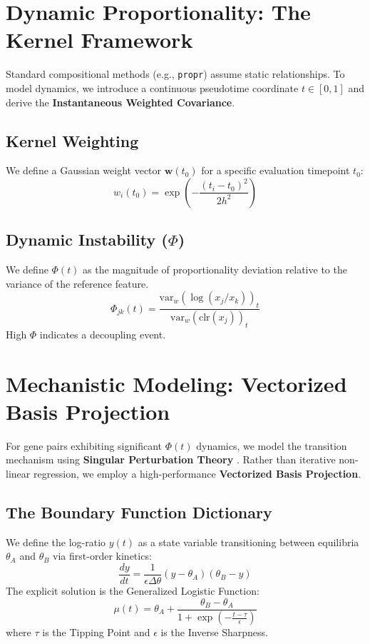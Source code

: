 \documentclass[11pt, a4paper]{article}
\begin{document}
\section{Dynamic Proportionality: The Kernel Framework}

Standard compositional methods (e.g., \texttt{propr}) assume static relationships. To model dynamics, we introduce a continuous pseudotime coordinate $t \in [0,1]$ and derive the \textbf{Instantaneous Weighted Covariance}.

\subsection{Kernel Weighting}
We define a Gaussian weight vector $\mathbf{w}(t_0)$ for a specific evaluation timepoint $t_0$:
\begin{equation}
w_i(t_0) = \exp\left( -\frac{(t_i - t_0)^2}{2h^2} \right)
\end{equation}

\subsection{Dynamic Instability ($\Phi$)}
We define $\Phi(t)$ as the magnitude of proportionality deviation relative to the variance of the reference feature.
\begin{equation}
\Phi_{jk}(t) = \frac{\text{var}_w(\log(x_j/x_k))_t}{\text{var}_w(\text{clr}(x_j))_t}
\end{equation}
High $\Phi$ indicates a decoupling event.

\section{Mechanistic Modeling: Vectorized Basis Projection}

For gene pairs exhibiting significant $\Phi(t)$ dynamics, we model the transition mechanism using \textbf{Singular Perturbation Theory} \citep{verhulst1838}. Rather than iterative non-linear regression, we employ a high-performance \textbf{Vectorized Basis Projection}.

\subsection{The Boundary Function Dictionary}
We define the log-ratio $y(t)$ as a state variable transitioning between equilibria $\theta_A$ and $\theta_B$ via first-order kinetics:
\begin{equation}
\frac{dy}{dt} = \frac{1}{\epsilon \Delta\theta} (y - \theta_A)(\theta_B - y)
\end{equation}
The explicit solution is the Generalized Logistic Function:
\begin{equation}
\mu(t) = \theta_A + \frac{\theta_B - \theta_A}{1 + \exp\left(-\frac{t - \tau}{\epsilon}\right)}
\end{equation}
where $\tau$ is the Tipping Point and $\epsilon$ is the Inverse Sharpness.
\end{document}

